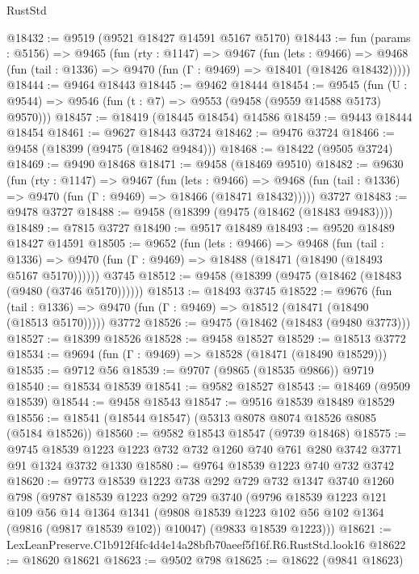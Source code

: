 \begin{lexlean}{RustStd}
\begin{coremodule}
@18432 := @9519 (@9521 @18427 @14591 @5167 @5170)
@18443 := fun (params : @5156) =>
  @9465
    (fun (rty : @1147) =>
    @9467
      (fun (lets : @9466) =>
      @9468 (fun (tail : @1336) => @9470 (fun (Γ : @9469) => @18401 (@18426 @18432)))))
@18444 := @9464 @18443
@18445 := @9462 @18444
@18454 := @9545
    (fun (U : @9544) => @9546 (fun (t : @7) => @9553 (@9458 (@9559 @14588 @5173) @9570)))
@18457 := @18419 (@18445 @18454) @14586
@18459 := @9443 @18444 @18454
@18461 := @9627 @18443 @3724
@18462 := @9476 @3724
@18466 := @9458 (@18399 (@9475 (@18462 @9484)))
@18468 := @18422 (@9505 @3724)
@18469 := @9490 @18468
@18471 := @9458 (@18469 @9510)
@18482 := @9630
    (fun (rty : @1147) =>
    @9467
      (fun (lets : @9466) =>
      @9468 (fun (tail : @1336) => @9470 (fun (Γ : @9469) => @18466 (@18471 @18432)))))
    @3727
@18483 := @9478 @3727
@18488 := @9458 (@18399 (@9475 (@18462 (@18483 @9483))))
@18489 := @7815 @3727
@18490 := @9517 @18489
@18493 := @9520 @18489 @18427 @14591
@18505 := @9652
    (fun (lets : @9466) =>
    @9468
      (fun (tail : @1336) =>
      @9470 (fun (Γ : @9469) => @18488 (@18471 (@18490 (@18493 @5167 @5170))))))
    @3745
@18512 := @9458 (@18399 (@9475 (@18462 (@18483 (@9480 (@3746 @5170))))))
@18513 := @18493 @3745
@18522 := @9676
    (fun (tail : @1336) => @9470 (fun (Γ : @9469) => @18512 (@18471 (@18490 (@18513 @5170)))))
    @3772
@18526 := @9475 (@18462 (@18483 (@9480 @3773)))
@18527 := @18399 @18526
@18528 := @9458 @18527
@18529 := @18513 @3772
@18534 := @9694 (fun (Γ : @9469) => @18528 (@18471 (@18490 @18529)))
@18535 := @9712 @56
@18539 := @9707 (@9865 (@18535 @9866)) @9719
@18540 := @18534 @18539
@18541 := @9582 @18527
@18543 := @18469 (@9509 @18539)
@18544 := @9458 @18543
@18547 := @9516 @18539 @18489 @18529
@18556 := @18541 (@18544 @18547) (@5313 @8078 @8074 @18526 @8085 (@5184 @18526))
@18560 := @9582 @18543 @18547 (@9739 @18468)
@18575 := @9745 @18539 @1223 @1223 @732 @732 @1260 @740 @761 @280 @3742 @3771 @91 @1324 @3732 @1330
@18580 := @9764 @18539 @1223 @740 @732 @3742
@18620 := @9773
    @18539
    @1223
    @738
    @292
    @729
    @732
    @1347
    @3740
    @1260
    @798
    (@9787
      @18539
      @1223
      @292
      @729
      @3740
      (@9796
        @18539
        @1223
        @121
        @109
        @56
        @14
        @1364
        @1341
        (@9808 @18539 @1223 @102 @56 @102 @1364 (@9816 (@9817 @18539 @102)) @10047)
        (@9833 @18539 @1223)))
@18621 := LexLeanPreserve.C1b912f4fc4d4e14a28bfb70aeef5f16f.R6.RustStd.look16
@18622 := @18620 @18621
@18623 := @9502 @798
@18625 := @18622 (@9841 @18623)

\end{coremodule}
\end{lexlean}
